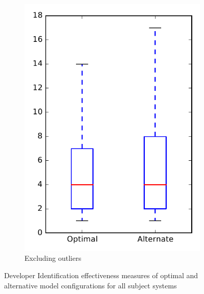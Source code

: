 \begin{figure}
\begin{subfigure}{.4\textwidth}
        \includegraphics[height=0.4\textheight]{figures/combo/dit_rq1_overview_no_outlier}
        \caption{Excluding outliers}\label{fig:combo:dit:rq1:overview_no_outlier}
    \end{subfigure}
\caption{Developer Identification effectiveness measures of optimal and alternative model configurations for all subject systems}
\label{fig:combo:dit:rq1:overview}
\end{figure}
